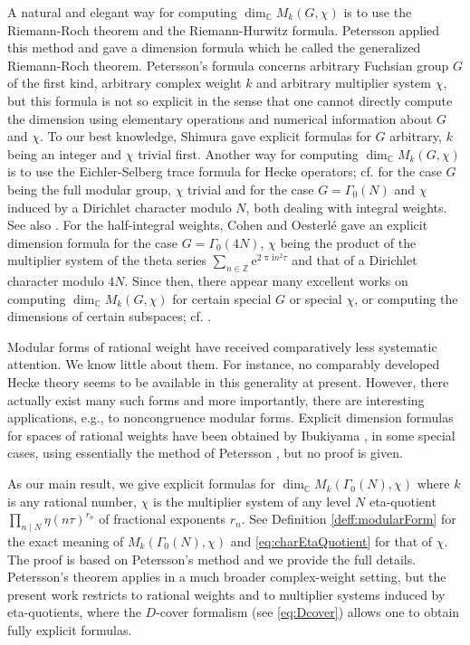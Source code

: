 \documentclass[12pt]{amsart}
\numberwithin{equation}{section}
\theoremstyle{plain}
\theoremstyle{definition}
\theoremstyle{remark}
\newcommand\rmi{\mathrm{i}}
\newcommand\rme{\mathrm{e}}
\newcommand\numZ{\mathbb{Z}}
\newcommand\numC{\mathbb{C}}
\begin{document}
A natural and elegant way for computing $\dim_\numC M_k(G,\chi)$ is to use the Riemann-Roch theorem and the Riemann-Hurwitz formula. Petersson \cite[p. 194]{Pet38} applied this method and gave a dimension formula which he called the generalized Riemann-Roch theorem. Petersson's formula concerns arbitrary Fuchsian group $G$ of the first kind, arbitrary complex weight $k$ and arbitrary multiplier system $\chi$, but this formula is not so explicit in the sense that one cannot directly compute the dimension using elementary operations and numerical information about $G$ and $\chi$. To our best knowledge, Shimura \cite[Section 2.4]{Shi71} gave explicit formulas for $G$ arbitrary, $k$ being an integer and $\chi$ trivial first. Another way for computing $\dim_\numC M_k(G,\chi)$ is to use the Eichler-Selberg trace formula for Hecke operators; cf. \cite{Zag77_1,Zag77_2} for the case $G$ being the full modular group, $\chi$ trivial and \cite{Coh77} for the case $G=\Gamma_0(N)$ and $\chi$ induced by a Dirichlet character modulo $N$, both dealing with integral weights. See also \cite{Hij74}. For the half-integral weights, Cohen and Oesterl\'e \cite{CO77} gave an explicit dimension formula for the case $G=\Gamma_0(4N)$, $\chi$ being the product of the multiplier system of the theta series $\sum_{n\in\numZ}\rme^{2\uppi\rmi n^2\tau}$ and that of a Dirichlet character modulo $4N$. Since then, there appear many excellent works on computing $\dim_\numC M_k(G,\chi)$ for certain special $G$ or special $\chi$, or computing the dimensions of certain subspaces; cf. \cite{Mar05,Que10, KP17,Mar18,ZZ22,Ros26}.

Modular forms of rational weight have received comparatively less systematic attention. We know little about them. For instance, no comparably developed Hecke theory seems to be available in this generality at present. However, there actually exist many such forms and more importantly, there are interesting applications, e.g., to noncongruence modular forms. Explicit dimension formulas for spaces of rational weights have been obtained by Ibukiyama \cite[Lemma 1.7]{Ibu00}, \cite[p. 5]{Ibu20} in some special cases, using essentially the method of Petersson \cite{Pet38}, but no proof is given.

As our main result, we give explicit formulas for $\dim_\numC M_k(\Gamma_0(N),\chi)$ where $k$ is any rational number, $\chi$ is the multiplier system of any level $N$ eta-quotient $\prod_{n\mid N}\eta(n\tau)^{r_n}$ of fractional exponents $r_n$. See Definition \ref{deff:modularForm} for the exact meaning of $M_k(\Gamma_0(N),\chi)$ and \eqref{eq:charEtaQuotient} for that of $\chi$. The proof is based on Petersson's method \cite{Pet38} and we provide the full details. Petersson’s theorem applies in a much broader complex-weight setting, but the present work restricts to rational weights and to multiplier systems induced by eta-quotients, where the $D$-cover formalism (see \eqref{eq:Dcover}) allows one to obtain fully explicit formulas.
\end{document}
